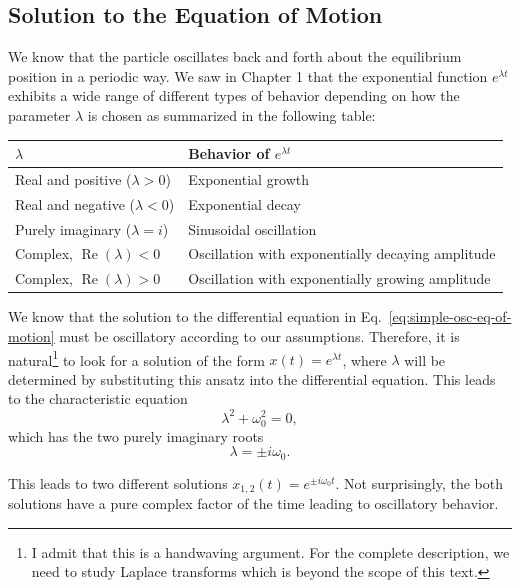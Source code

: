 \documentclass[../main.tex]{subfiles}
\begin{document}
\subsection{\label{sec:solution-simple-osc}Solution to the Equation of Motion}
We know that the particle oscillates back and forth about the equilibrium position in a periodic way. We saw in Chapter 1 that the exponential function $e^{\lambda t}$ exhibits a wide range of different types of behavior depending on how the parameter $\lambda$ is chosen as summarized in the following table:

\begin{table}[h]
    \centering
    \begin{tabular}{ll}
        \hline
        $\lambda$ & Behavior of $e^{\lambda t}$ \\
        \hline
        Real and positive ($\lambda > 0$) & Exponential growth \\
        Real and negative ($\lambda < 0$) & Exponential decay \\
        Purely imaginary ($\lambda = i$) & Sinusoidal oscillation \\
        Complex, $\operatorname{Re}(\lambda) < 0$ & Oscillation with exponentially decaying amplitude \\
        Complex, $\operatorname{Re}(\lambda) > 0$ & Oscillation with exponentially growing amplitude \\
        \hline
    \end{tabular}
\end{table}

We know that the solution to the differential equation in Eq.~\ref{eq:simple-osc-eq-of-motion} must be oscillatory according to our assumptions. Therefore, it is natural\footnote{I admit that this is a handwaving argument. For the complete description, we need to study Laplace transforms which is beyond the scope of this text.} to look for a solution of the form $x(t)=e^{\lambda t}$, where $\lambda$ will be determined by substituting this ansatz into the differential equation. This leads to the characteristic equation
\begin{equation}
    \lambda^2+\omega_0^2=0,
\end{equation}
which has the two purely imaginary roots
\begin{equation}
    \lambda=\pm i\omega_0.
\end{equation}

This leads to two different solutions
$x_{1,2}(t)=e^{\pm i\omega_0 t}$. Not surprisingly, the both solutions have a pure complex factor of the time leading to oscillatory behavior.
\end{document}

